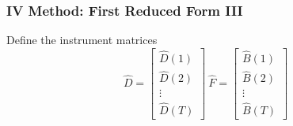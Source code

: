 \begin{frame}[allowframebreaks]%

\frametitle{IV Method: First Reduced Form III}

Define the instrument matrices%
\begin{equation*}
\hat{D}=\left[ 
\begin{array}{c}
\hat{D}\left( 1\right)  \\ 
\hat{D}\left( 2\right)  \\ 
\vdots  \\ 
\hat{D}\left( T\right) 
\end{array}%
\right] \ \hat{F}=\left[ 
\begin{array}{c}
\hat{B}\left( 1\right)  \\ 
\hat{B}\left( 2\right)  \\ 
\vdots  \\ 
\hat{B}\left( T\right) 
\end{array}%
\right] 
\end{equation*}

\end{frame}%
